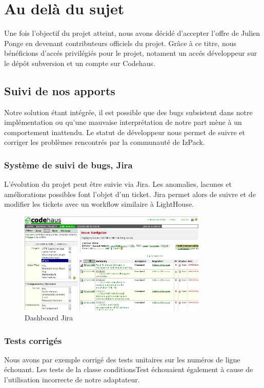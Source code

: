 \section{Au delà du sujet}
Une fois l'objectif du projet atteint, nous avons décidé d'accepter l'offre de Julien Ponge en devenant contributeurs officiels du projet.
Grâce à ce titre, nous bénéficions d'accés privilégiés pour le projet, notament un accés développeur sur le dépôt subversion et un compte sur Codehaus.
\subsection{Suivi de nos apports}
Notre solution étant intégrée, il est possible que des bugs subsistent dans notre implémentation ou qu'une mauvaise interprétation de notre part mène à un comportement inattendu.
Le statut de développeur nous permet de suivre et corriger les problèmes rencontrés par la communauté de IzPack.
\subsubsection{Système de suivi de bugs, Jira}
L'évolution du projet peut être suivie via Jira.
Les anomalies, lacunes et améliorations possibles font l'objet d'un ticket.
Jira permet alors de suivre et de modifier les tickets avec un workflow similaire à LightHouse.
\begin{figure}[H]
	\centering
	\includegraphics[width=0.8\textwidth]{../image/jira.png}
	\caption{Dashboard Jira}
\end{figure}
\subsubsection{Tests corrigés}
Nous avons par exemple corrigé des tests unitaires sur les numéros de ligne échouant.
Les tests de la classe conditionsTest échouaient également à cause de l'utilisation incorrecte de notre adaptateur.

